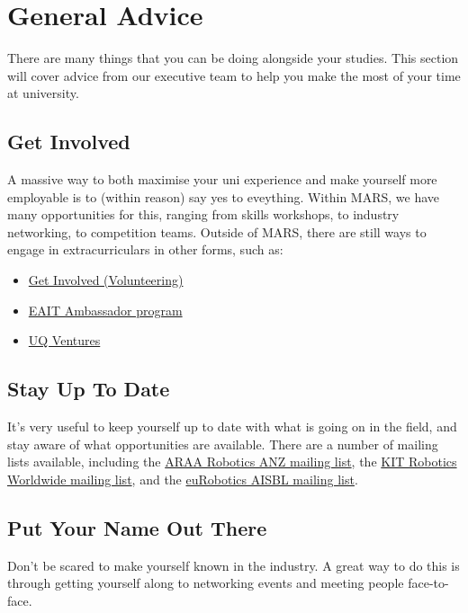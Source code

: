 \chapter{General Advice}
There are many things that you can be doing alongside your studies. This section will cover advice from our executive team to help you make the most of your time at university.

\section{Get Involved}
A massive way to both maximise your uni experience and make yourself more employable is to (within reason) say yes to eveything. Within MARS, we have many opportunities for this, ranging from skills workshops, to industry networking, to competition teams. Outside of MARS, there are still ways to engage in extracurriculars in other forms, such as:
\begin{itemize}
    \item \href{https://life.uq.edu.au/get-involved}{Get Involved (Volunteering)}
    \item \href{https://www.eait.uq.edu.au/current-students/eait-ambassadors}{EAIT Ambassador program}
    \item \href{https://ventures.uq.edu.au/}{UQ Ventures}
\end{itemize}

\section{Stay Up To Date}
It's very useful to keep yourself up to date with what is going on in the field, and stay aware of what opportunities are available. There are a number of mailing lists available, including the \href{https://lists.csiro.au/mailman/listinfo/robotics-australia-nz-list}{ARAA Robotics ANZ mailing list}, the \href{https://www.lists.kit.edu/sympa/info/robotics-worldwide}{KIT Robotics Worldwide mailing list}, and the \href{http://mailing.eu-robotics.net/info/community}{euRobotics AISBL mailing list}.

\section{Put Your Name Out There}
Don't be scared to make yourself known in the industry. A great way to do this is through getting yourself along to networking events and meeting people face-to-face.

